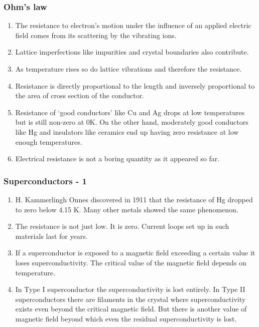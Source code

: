 \documentclass{beamer}
\begin{document}
\begin{frame}
\frametitle{Ohm's law}
\begin{enumerate}
\item The resistance to electron's motion under the influence of an applied 
electric field comes from its scattering by the vibrating ions.
\item Lattice imperfections like impurities and crystal boundaries also 
contribute.
\item As temperature rises so do lattice vibrations and therefore the 
resistance.
\item Resistance is directly proportional to the length and inversely 
proportional to the area of cross section of the conductor.
\item Resistance of `good conductors' like Cu and Ag drops at low temperatures
but is still non-zero at 0K. On the other hand, moderately good conductors like
Hg and insulators like ceramics end up having zero resistance at low enough 
temperatures.
\item Electrical resistance is not a boring quantity as it appeared so far.
\end{enumerate}
\end{frame}

\begin{frame}
\frametitle{Superconductors - 1}
\begin{enumerate}
\item H. Kammerlingh Onnes discovered in 1911 that the resistance of Hg dropped
to zero below 4.15 K. Many other metals showed the same phenomenon.
\item The resistance is not just low. It is zero. Current loops set up in such
materials last for years.
\item If a superconductor is exposed to a magnetic field exceeding a certain 
value it loses superconductivity. The critical value of the magnetic field 
depends on temperature.
\item In Type I superconductor the superconductivity is lost entirely. In Type
II superconductors there are filaments in the crystal where superconductivity
exists even beyond the critical magnetic field. But there is another value of 
magnetic field beyond which even the residual superconductivity is lost.
\end{enumerate}
\end{frame}
\end{document}

